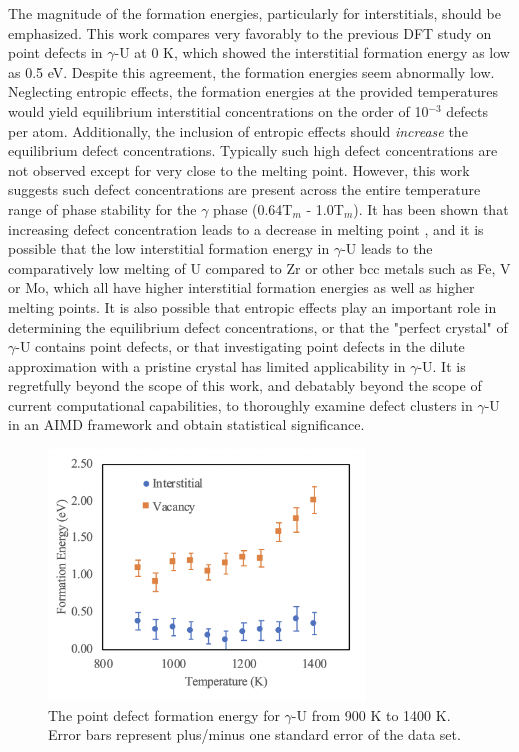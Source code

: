 \documentclass[review]{elsarticle}
\begin{document}
The magnitude of the formation energies, particularly for interstitials, should be emphasized. This work compares very favorably to the previous DFT study on point defects in $\gamma$-U at 0 K\cite{beeler2010}, which showed the interstitial formation energy as low as 0.5 eV. Despite this agreement, the formation energies seem abnormally low.  Neglecting entropic effects, the formation energies at the provided temperatures would yield equilibrium interstitial concentrations on the order of 10$^{-3}$ defects per atom. Additionally, the inclusion of entropic effects should \textit{increase} the equilibrium defect concentrations. Typically such high defect concentrations are not observed except for very close to the melting point. However, this work suggests such defect concentrations are present across the entire temperature range of phase stability for the $\gamma$ phase (0.64T$_m$ - 1.0T$_m$). It has been shown that increasing defect concentration leads to a decrease in melting point \cite{sorkin2003}, and it is possible that the low interstitial formation energy in $\gamma$-U leads to the comparatively low melting of U compared to Zr or other bcc metals \cite{williams1990} such as Fe, V or Mo, which all have higher interstitial formation energies \cite{mendelev2010, mendelev2009, nguyen2006} as well as higher melting points. It is also possible that entropic effects play an important role in determining the equilibrium defect concentrations, or that the "perfect crystal" of $\gamma$-U contains point defects, or that investigating point defects in the dilute approximation with a pristine crystal has limited applicability in $\gamma$-U. It is regretfully beyond the scope of this work, and debatably beyond the scope of current computational capabilities, to thoroughly examine defect clusters in $\gamma$-U in an AIMD framework and obtain statistical significance. 

 \begin{figure}[h]
 \centering
 \includegraphics[width=0.75\textwidth]{5_eform.png} 
 \caption{The point defect formation energy for $\gamma$-U from 900 K to 1400 K. Error bars represent plus/minus one standard error of the data set. }
 \label{fig:eform}
\end{figure}
\end{document}
